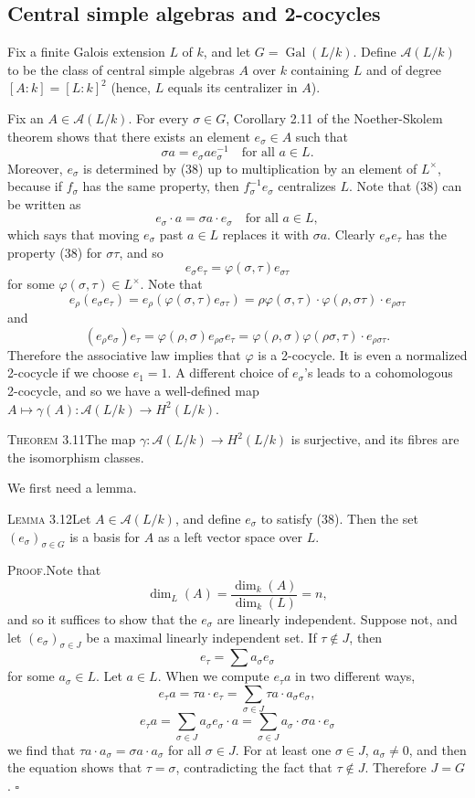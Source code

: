 \subsection*{Central simple algebras and 2-cocycles}

Fix a finite Galois extension $L$ of $k$, and let $G=\operatorname{Gal}(L/k)$. Define $\mathcal{A}(L/k)$ to be the class of central simple algebras $A$ over $k$ containing $L$ and of degree $[A:k]=[L:k]^2$ (hence, $L$ equals its centralizer in $A$).

Fix an $A\in\mathcal{A}(L/k)$. For every $\sigma\in G$, Corollary 2.11 of the Noether-Skolem theorem shows that there exists an element $e_\sigma\in A$ such that
\[
\sigma a=e_\sigma a e_\sigma^{-1}\quad\text{for all } a\in L. \tag{38}
\]
Moreover, $e_\sigma$ is determined by (38) up to multiplication by an element of $L^\times$, because if $f_\sigma$ has the same property, then $f_\sigma^{-1}e_\sigma$ centralizes $L$. Note that (38) can be written as
\[
e_\sigma\cdot a=\sigma a\cdot e_\sigma\quad\text{for all } a\in L, \tag{39}
\]
which says that moving $e_\sigma$ past $a\in L$ replaces it with $\sigma a$. Clearly $e_\sigma e_\tau$ has the property (38) for $\sigma\tau$, and so
\[
e_\sigma e_\tau=\varphi(\sigma,\tau)e_{\sigma\tau} \tag{40}
\]
for some $\varphi(\sigma,\tau)\in L^\times$. Note that
\[
e_\rho(e_\sigma e_\tau)=e_\rho(\varphi(\sigma,\tau)e_{\sigma\tau})=\rho\varphi(\sigma,\tau)\cdot\varphi(\rho,\sigma\tau)\cdot e_{\rho\sigma\tau}
\]
and
\[
(e_\rho e_\sigma)e_\tau=\varphi(\rho,\sigma)e_{\rho\sigma}e_\tau=\varphi(\rho,\sigma)\varphi(\rho\sigma,\tau)\cdot e_{\rho\sigma\tau}.
\]
Therefore the associative law implies that $\varphi$ is a 2-cocycle. It is even a normalized 2-cocycle if we choose $e_1=1$. A different choice of $e_\sigma$'s leads to a cohomologous 2-cocycle, and so we have a well-defined map $A\mapsto\gamma(A)\colon\mathcal{A}(L/k)\to H^2(L/k)$.

\noindent\textsc{Theorem 3.11}\quad The map $\gamma\colon\mathcal{A}(L/k)\to H^2(L/k)$ is surjective, and its fibres are the isomorphism classes.

We first need a lemma.

\noindent\textsc{Lemma 3.12}\quad Let $A\in\mathcal{A}(L/k)$, and define $e_\sigma$ to satisfy (38). Then the set $(e_\sigma)_{\sigma\in G}$ is a basis for $A$ as a left vector space over $L$.

\noindent\textsc{Proof.}\quad Note that
\[
\dim_L(A)=\frac{\dim_k(A)}{\dim_k(L)}=n,
\]
and so it suffices to show that the $e_\sigma$ are linearly independent. Suppose not, and let $(e_\sigma)_{\sigma\in J}$ be a maximal linearly independent set. If $\tau\notin J$, then
\[
e_\tau=\sum a_\sigma e_\sigma
\]
for some $a_\sigma\in L$. Let $a\in L$. When we compute $e_\tau a$ in two different ways,
\[
e_\tau a=\tau a\cdot e_\tau=\sum_{\sigma\in J}\tau a\cdot a_\sigma e_\sigma,
\]
\[
e_\tau a=\sum_{\sigma\in J}a_\sigma e_\sigma\cdot a=\sum_{\sigma\in J}a_\sigma\cdot\sigma a\cdot e_\sigma
\]
we find that $\tau a\cdot a_\sigma=\sigma a\cdot a_\sigma$ for all $\sigma\in J$. For at least one $\sigma\in J$, $a_\sigma\neq0$, and then the equation shows that $\tau=\sigma$, contradicting the fact that $\tau\notin J$. Therefore $J=G$. \hfill$\square$

